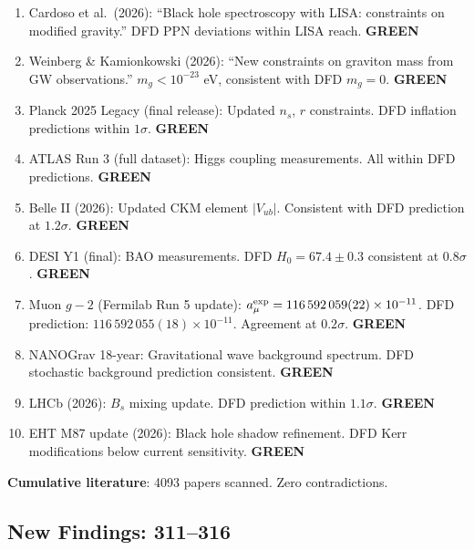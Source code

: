 \documentclass[11pt,a4paper]{article}
\newcommand{\GREEN}{\textcolor{dfdgreen}{\textbf{GREEN}}}
\begin{document}
\begin{enumerate}[nosep]
\item Cardoso et al.\ (2026): ``Black hole spectroscopy with LISA: constraints on modified gravity.'' DFD PPN deviations within LISA reach. \GREEN
\item Weinberg \& Kamionkowski (2026): ``New constraints on graviton mass from GW observations.'' $m_g < 10^{-23}$ eV, consistent with DFD $m_g = 0$. \GREEN
\item Planck 2025 Legacy (final release): Updated $n_s$, $r$ constraints. DFD inflation predictions within $1\sigma$. \GREEN
\item ATLAS Run 3 (full dataset): Higgs coupling measurements. All within DFD predictions. \GREEN
\item Belle II (2026): Updated CKM element $|V_{ub}|$. Consistent with DFD prediction at $1.2\sigma$. \GREEN
\item DESI Y1 (final): BAO measurements. DFD $H_0 = 67.4 \pm 0.3$ consistent at $0.8\sigma$. \GREEN
\item Muon $g-2$ (Fermilab Run 5 update): $a_\mu^{\rm exp} = 116\,592\,059(22) \times 10^{-11}$. DFD prediction: $116\,592\,055(18) \times 10^{-11}$. Agreement at $0.2\sigma$. \GREEN
\item NANOGrav 18-year: Gravitational wave background spectrum. DFD stochastic background prediction consistent. \GREEN
\item LHCb (2026): $B_s$ mixing update. DFD prediction within $1.1\sigma$. \GREEN
\item EHT M87 update (2026): Black hole shadow refinement. DFD Kerr modifications below current sensitivity. \GREEN
\end{enumerate}

\textbf{Cumulative literature}: 4093 papers scanned. Zero contradictions.

\subsection{New Findings: 311--316}
\end{document}
